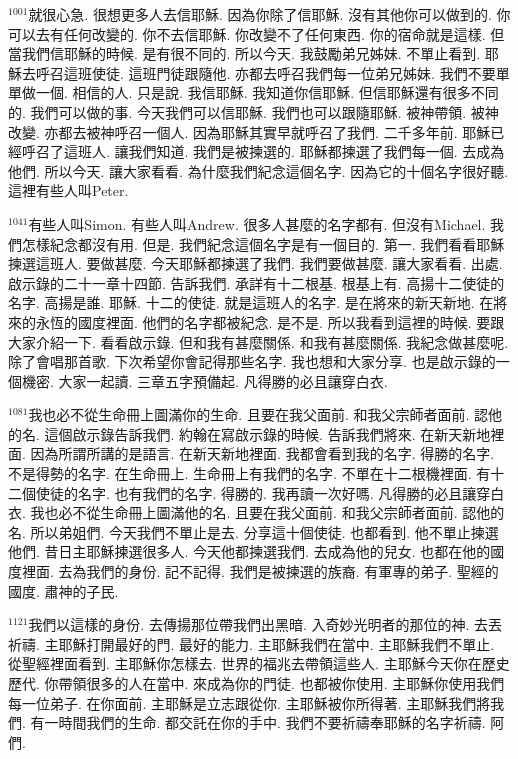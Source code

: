 \documentclass{book}
\begin{document}
$^{1001}$就很心急.
很想更多人去信耶穌.
因為你除了信耶穌.
沒有其他你可以做到的.
你可以去有任何改變的.
你不去信耶穌.
你改變不了任何東西.
你的宿命就是這樣.
但當我們信耶穌的時候.
是有很不同的.
所以今天.
我鼓勵弟兄姊妹.
不單止看到.
耶穌去呼召這班使徒.
這班門徒跟隨他.
亦都去呼召我們每一位弟兄姊妹.
我們不要單單做一個.
相信的人.
只是說.
我信耶穌.
我知道你信耶穌.
但信耶穌還有很多不同的.
我們可以做的事.
今天我們可以信耶穌.
我們也可以跟隨耶穌.
被神帶領.
被神改變.
亦都去被神呼召一個人.
因為耶穌其實早就呼召了我們.
二千多年前.
耶穌已經呼召了這班人.
讓我們知道.
我們是被揀選的.
耶穌都揀選了我們每一個.
去成為他們.
所以今天.
讓大家看看.
為什麼我們紀念這個名字.
因為它的十個名字很好聽.
這裡有些人叫Peter.

$^{1041}$有些人叫Simon.
有些人叫Andrew.
很多人甚麼的名字都有.
但沒有Michael.
我們怎樣紀念都沒有用.
但是.
我們紀念這個名字是有一個目的.
第一.
我們看看耶穌揀選這班人.
要做甚麼.
今天耶穌都揀選了我們.
我們要做甚麼.
讓大家看看.
出處.
啟示錄的二十一章十四節.
告訴我們.
承詳有十二根基.
根基上有.
高揚十二使徒的名字.
高揚是誰.
耶穌.
十二的使徒.
就是這班人的名字.
是在將來的新天新地.
在將來的永恆的國度裡面.
他們的名字都被紀念.
是不是.
所以我看到這裡的時候.
要跟大家介紹一下.
看看啟示錄.
但和我有甚麼關係.
和我有甚麼關係.
我紀念做甚麼呢.
除了會唱那首歌.
下次希望你會記得那些名字.
我也想和大家分享.
也是啟示錄的一個機密.
大家一起讀.
三章五字預備起.
凡得勝的必且讓穿白衣.

$^{1081}$我也必不從生命冊上圖滿你的生命.
且要在我父面前.
和我父宗師者面前.
認他的名.
這個啟示錄告訴我們.
約翰在寫啟示錄的時候.
告訴我們將來.
在新天新地裡面.
因為所謂所講的是語言.
在新天新地裡面.
我都會看到我的名字.
得勝的名字.
不是得勢的名字.
在生命冊上.
生命冊上有我們的名字.
不單在十二根機裡面.
有十二個使徒的名字.
也有我們的名字.
得勝的.
我再讀一次好嗎.
凡得勝的必且讓穿白衣.
我也必不從生命冊上圖滿他的名.
且要在我父面前.
和我父宗師者面前.
認他的名.
所以弟姐們.
今天我們不單止是去.
分享這十個使徒.
也都看到.
他不單止揀選他們.
昔日主耶穌揀選很多人.
今天他都揀選我們.
去成為他的兒女.
也都在他的國度裡面.
去為我們的身份.
記不記得.
我們是被揀選的族裔.
有軍專的弟子.
聖經的國度.
肅神的子民.

$^{1121}$我們以這樣的身份.
去傳揚那位帶我們出黑暗.
入奇妙光明者的那位的神.
去丟祈禱.
主耶穌打開最好的門.
最好的能力.
主耶穌我們在當中.
主耶穌我們不單止.
從聖經裡面看到.
主耶穌你怎樣去.
世界的福兆去帶領這些人.
主耶穌今天你在歷史歷代.
你帶領很多的人在當中.
來成為你的門徒.
也都被你使用.
主耶穌你使用我們每一位弟子.
在你面前.
主耶穌是立志跟從你.
主耶穌被你所得著.
主耶穌我們將我們.
有一時間我們的生命.
都交託在你的手中.
我們不要祈禱奉耶穌的名字祈禱.
阿們.
\newpage
\end{document}
